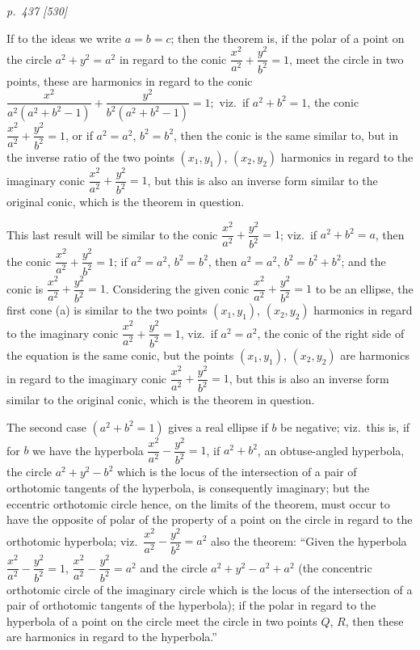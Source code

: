 \documentclass[11pt,a4paper]{book}
\begin{document}
\clearpage

\bigskip
\textit{p.~437 [530]}
\smallskip

\noindent
If to the ideas we write $a = b = c$; then the theorem is, if the polar of a
point on the circle $a^2 + y^2 = a^2$ in regard to the conic $\dfrac{x^2}{a^2} + \dfrac{y^2}{b^2} = 1$, meet the circle
in two points, these are harmonics in regard to the conic $\dfrac{x^2}{a^2(a^2 + b^2 - 1)} + \dfrac{y^2}{b^2(a^2 + b^2 - 1)} = 1;$ viz.\
if $a^2 + b^2 = 1$, the conic $\dfrac{x^2}{a^2} + \dfrac{y^2}{b^2} = 1$, or if $a^2 = a^2$, $b^2 = b^2$, then the conic is the
same similar to, but in the inverse ratio of the two points $(x_1, y_1)$, $(x_2, y_2)$
harmonics in regard to the imaginary conic $\dfrac{x^2}{a^2} + \dfrac{y^2}{b^2} = 1$, but this is also an inverse
form similar to the original conic, which is the theorem in question.

This last result will be similar to the conic $\dfrac{x^2}{a^2} + \dfrac{y^2}{b^2} = 1$; viz.\ if
$a^2 + b^2 = a$, then the conic $\dfrac{x^2}{a^2} + \dfrac{y^2}{b^2} = 1$; if $a^2 = a^2$, $b^2 = b^2$, then $a^2 = a^2$,
$b^2 = b^2 + b^2$; and the conic is $\dfrac{x^2}{a^2} + \dfrac{y^2}{b^2} = 1$. Considering the given conic $\dfrac{x^2}{a^2} + \dfrac{y^2}{b^2} = 1$
to be an ellipse, the first cone (a) is similar to the two points $(x_1, y_1)$, $(x_2, y_2)$
harmonics in regard to the imaginary conic $\dfrac{x^2}{a^2} + \dfrac{y^2}{b^2} = 1$, viz.\ if $a^2 = a^2$, the conic
of the right side of the equation is the same conic, but the points $(x_1, y_1)$, $(x_2, y_2)$
are harmonics in regard to the imaginary conic $\dfrac{x^2}{a^2} + \dfrac{y^2}{b^2} = 1$, but this is also an inverse
form similar to the original conic, which is the theorem in question.

The second case $(a^2 + b^2 = 1)$ gives a real ellipse if $b$ be negative; viz.\ this
is, if for $b$ we have the hyperbola $\dfrac{x^2}{a^2} - \dfrac{y^2}{b^2} = 1$, if $a^2 + b^2$, an obtuse-angled hyperbola,
the circle $a^2 + y^2 - b^2$ which is the locus of the intersection of a pair of orthotomic
tangents of the hyperbola, is consequently imaginary; but the eccentric orthotomic
circle hence, on the limits of the theorem, must occur to have the opposite of polar
of the property of a point on the circle in regard to the orthotomic hyperbola; viz.\ $\dfrac{x^2}{a^2} - \dfrac{y^2}{b^2} = a^2$ also
the theorem: ``Given the hyperbola $\dfrac{x^2}{a^2} - \dfrac{y^2}{b^2} = 1$, $\dfrac{x^2}{a^2} - \dfrac{y^2}{b^2} = a^2$ and the circle $a^2 + y^2 - a^2 + a^2$
(the concentric orthotomic circle of the imaginary circle which is the locus of the
intersection of a pair of orthotomic tangents of the hyperbola); if the polar in regard
to the hyperbola of a point on the circle meet the circle in two points $Q$, $R$, then
these are harmonics in regard to the hyperbola.''
\end{document}

